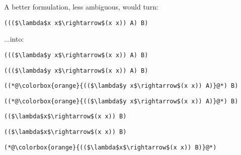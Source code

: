 \documentclass{beamer}
\begin{document}
\begin{frame}[fragile]{\CurrentSection}
\begin{exampleblock}{}
A better formulation, less ambiguous, would turn:
\end{exampleblock}

 
\lstset{basicstyle=\ttfamily\small}\lstset{numbers=none}\lstset{language=ML}\begin{lstlisting}
((($\lambda$x x$\rightarrow$(x x)) A) B)
\end{lstlisting}
 
\begin{exampleblock}{}
...into:
\end{exampleblock}

 
\lstset{basicstyle=\ttfamily\small}\lstset{numbers=none}\lstset{language=ML}\begin{lstlisting}
((($\lambda$y x$\rightarrow$(x x)) A) B)
\end{lstlisting}
 

\end{frame}

\begin{frame}[fragile]{\CurrentSection}
\lstset{basicstyle=\ttfamily\small}\lstset{numbers=none}\lstset{language=ML}\begin{lstlisting}
((($\lambda$y x$\rightarrow$(x x)) A) B)
\end{lstlisting}
\pause\lstset{language=ML}\begin{lstlisting}
((*@\colorbox{orange}{(($\lambda$y x$\rightarrow$(x x)) A)}@*) B)
\end{lstlisting}

\end{frame}

\begin{frame}[fragile]{\CurrentSection}
\lstset{basicstyle=\ttfamily\small}\lstset{numbers=none}\lstset{language=ML}\begin{lstlisting}
((*@\colorbox{orange}{(($\lambda$y x$\rightarrow$(x x)) A)}@*) B)
\end{lstlisting}
\pause\lstset{language=ML}\begin{lstlisting}
(($\lambda$x$\rightarrow$(x x)) B)
\end{lstlisting}

\end{frame}

\begin{frame}[fragile]{\CurrentSection}
\lstset{basicstyle=\ttfamily\small}\lstset{numbers=none}\lstset{language=ML}\begin{lstlisting}
(($\lambda$x$\rightarrow$(x x)) B)
\end{lstlisting}
\pause\lstset{language=ML}\begin{lstlisting}
(*@\colorbox{orange}{(($\lambda$x$\rightarrow$(x x)) B)}@*)
\end{lstlisting}

\end{frame}
\end{document}
